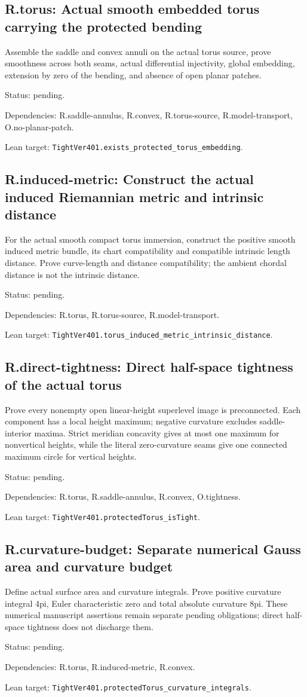 \documentclass{article}
\begin{document}
\subsection*{R.torus: Actual smooth embedded torus carrying the protected bending}
Assemble the saddle and convex annuli on the actual torus source, prove smoothness across both seams, actual differential injectivity, global embedding, extension by zero of the bending, and absence of open planar patches.
\par Status: pending.
\par Dependencies: R.saddle-annulus, R.convex, R.torus-source, R.model-transport, O.no-planar-patch.
\par Lean target: \texttt{TightVer401.exists\_protected\_torus\_embedding}.
\subsection*{R.induced-metric: Construct the actual induced Riemannian metric and intrinsic distance}
For the actual smooth compact torus immersion, construct the positive smooth induced metric bundle, its chart compatibility and compatible intrinsic length distance. Prove curve-length and distance compatibility; the ambient chordal distance is not the intrinsic distance.
\par Status: pending.
\par Dependencies: R.torus, R.torus-source, R.model-transport.
\par Lean target: \texttt{TightVer401.torus\_induced\_metric\_intrinsic\_distance}.
\subsection*{R.direct-tightness: Direct half-space tightness of the actual torus}
Prove every nonempty open linear-height superlevel image is preconnected. Each component has a local height maximum; negative curvature excludes saddle-interior maxima. Strict meridian concavity gives at most one maximum for nonvertical heights, while the literal zero-curvature seams give one connected maximum circle for vertical heights.
\par Status: pending.
\par Dependencies: R.torus, R.saddle-annulus, R.convex, O.tightness.
\par Lean target: \texttt{TightVer401.protectedTorus\_isTight}.
\subsection*{R.curvature-budget: Separate numerical Gauss area and curvature budget}
Define actual surface area and curvature integrals. Prove positive curvature integral 4pi, Euler characteristic zero and total absolute curvature 8pi. These numerical manuscript assertions remain separate pending obligations; direct half-space tightness does not discharge them.
\par Status: pending.
\par Dependencies: R.torus, R.induced-metric, R.convex.
\par Lean target: \texttt{TightVer401.protectedTorus\_curvature\_integrals}.
\end{document}

